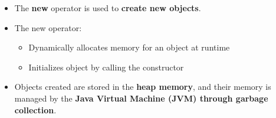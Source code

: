 \setlength{\columnsep}{3pt}
\begin{flushleft}

	\begin{itemize}
		\item The \textbf{new} operator is used to \textbf{create new objects}. 
		\item The new operator:
		\begin{itemize}
			\item Dynamically allocates memory for an object at runtime
			\item Initializes object by calling the constructor
		\end{itemize} 
		
		\bigskip
		
		\bigskip
		
		\item Objects created are stored in the \textbf{heap memory}, and their memory is managed by the \textbf{Java Virtual Machine (JVM) through garbage collection}.
		
	\end{itemize}

\end{flushleft}
\newpage



